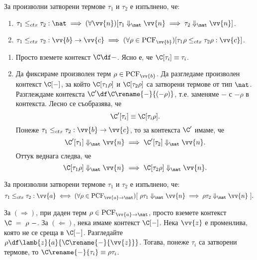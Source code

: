 \begin{proposition}\label{pr:pcf:context:simple}
  За произволни затворени термове $\tau_1$ и $\tau_2$ е изпълнено, че:
  \begin{enumerate}[(1)]
  \item
    $\tau_1 \leq_{ctx} \tau_2 : \nat \implies (\forall \vv{n})[\tau_1\Downarrow_{\nat}\vv{n} \implies \tau_2 \Downarrow_{\nat} \vv{n}]$.
  \item
    $\tau_1 \leq_{ctx} \tau_2 : \vv{b}\to\vv{c} \implies (\forall \rho\in\text{PCF}_{\vv{b}})[\tau_1\rho \leq_{ctx} \tau_2 \rho : \vv{c}]$.
  \end{enumerate}
\end{proposition}
\begin{hint}
  \begin{enumerate}[(1)]
  \item
    Просто вземете контекст $\C \df -$. Ясно е, че $\C[\tau_i] \equiv \tau_i$.
  \item
    Да фиксираме произволен терм $\rho\in\text{PCF}_{\vv{b}}$.
    Да разгледаме произволен контекст $\C[-]$, за който $\C[\tau_1\rho]$ и $\C[\tau_2\rho]$
    са затворени термове от тип $\nat$.
    Разглеждаме контекста $\C' \df \C\rename{-}{(-\rho)}$,
    т.е. заменяме $-$ с $-\rho$ в контекста.
    Лесно се съобразява, че \[\C'[\tau_i] \equiv \C[\tau_i\rho].\]
    Понеже $\tau_1 \leq_{ctx} \tau_2 : \vv{b}\to\vv{c}$,
    то за контекста $\C'$ имаме, че
    \[\C'[\tau_1] \Downarrow_{\nat} \vv{n} \implies \C'[\tau_2] \Downarrow_{\nat} \vv{n}.\]
    Оттук веднага следва, че 
    \[\C[\tau_1\rho] \Downarrow_{\nat} \vv{n} \implies \C[\tau_2\rho] \Downarrow_{\nat} \vv{n}.\]
  \end{enumerate}
\end{hint}

\begin{proposition}\label{pr:pcf:context:terms}
  За произволни затворени термове $\tau_1$ и $\tau_2$ е изпълнено, че:
  \[\tau_1 \leq_{ctx} \tau_2 : \vv{a} \iff (\forall \rho \in \text{PCF}_{\vv{a}\to\nat})[\ \rho\tau_1 \Downarrow_{\nat} \vv{n} \implies \rho\tau_2 \Downarrow_{\nat} \vv{n}\ ].\]
\end{proposition}
\begin{hint}
  За $(\Rightarrow)$, при даден терм $\rho \in \text{PCF}_{\vv{a}\to\nat}$, просто вземете контекст $\C~=~\rho~-$.
  За $(\Leftarrow)$, нека имаме контекст $\C[-]$.
  Нека $\vv{z}$ е променлива, която не се среща в $\C[-]$.
  Разгледайте $\rho \df \lamb{z}{a}{\C\rename{-}{\vv{z}}}$.
  Тогава, понеже $\tau_i$ са затворени термове, то
  $\C\rename{-}{\tau_i} \equiv \rho\tau_i$.
\end{hint}

